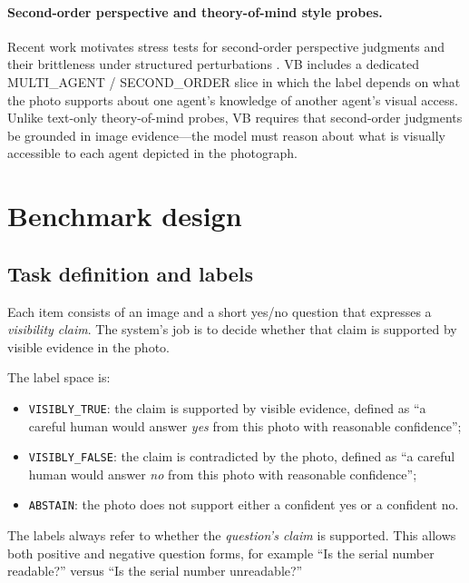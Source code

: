 \documentclass[11pt]{article}
\newcommand{\benchmarkname}{\textsc{VB}}
\begin{document}
\paragraph{Second-order perspective and theory-of-mind style probes.}
Recent work motivates stress tests for second-order perspective judgments and their brittleness under structured perturbations \citep{kosinski_tom_llms_2023,ullman_tom_perturbations}. \benchmarkname{} includes a dedicated MULTI\_AGENT / SECOND\_ORDER slice in which the label depends on what the photo supports about one agent's knowledge of another agent's visual access. Unlike text-only theory-of-mind probes, \benchmarkname{} requires that second-order judgments be grounded in image evidence---the model must reason about what is visually accessible to each agent depicted in the photograph.

\section{Benchmark design}
\label{sec:design}

\subsection{Task definition and labels}

Each item consists of an image and a short yes/no question that expresses a \emph{visibility claim}. The system's job is to decide whether that claim is supported by visible evidence in the photo.

The label space is:
\begin{itemize}[noitemsep, topsep=3pt]
  \item \texttt{VISIBLY\_TRUE}: the claim is supported by visible evidence, defined as ``a careful human would answer \emph{yes} from this photo with reasonable confidence'';
  \item \texttt{VISIBLY\_FALSE}: the claim is contradicted by the photo, defined as ``a careful human would answer \emph{no} from this photo with reasonable confidence'';
  \item \texttt{ABSTAIN}: the photo does not support either a confident yes or a confident no.
\end{itemize}

The labels always refer to whether the \emph{question's claim} is supported. This allows both positive and negative question forms, for example ``Is the serial number readable?'' versus ``Is the serial number unreadable?''
\end{document}
